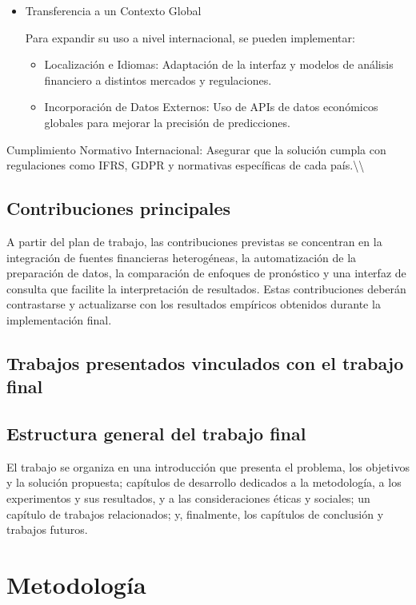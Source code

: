 \documentclass[12pt,letterpaper,oneside]{report}
\renewcommand{\_}{\UnderscoreOriginal\allowbreak}
\begin{document}
\begin{itemize}
\item Transferencia a un Contexto Global \parencite{CastroAguilar2017}

Para expandir su uso a nivel internacional, se pueden implementar:
\begin{itemize}
\item Localización e Idiomas: Adaptación de la interfaz y modelos de análisis financiero a distintos mercados y regulaciones.
\item Incorporación de Datos Externos: Uso de APIs de datos económicos globales para mejorar la precisión de predicciones.
\end{itemize}

\end{itemize}
Cumplimiento Normativo Internacional: Asegurar que la solución cumpla con regulaciones como IFRS, GDPR y normativas específicas de cada país.\textbackslash{}\textbackslash{}

\section{Contribuciones principales}
A partir del plan de trabajo, las contribuciones previstas se concentran en la integración de fuentes financieras heterogéneas, la automatización de la preparación de datos, la comparación de enfoques de pronóstico y una interfaz de consulta que facilite la interpretación de resultados. Estas contribuciones deberán contrastarse y actualizarse con los resultados empíricos obtenidos durante la implementación final.

\section{Trabajos presentados vinculados con el trabajo final}

\section{Estructura general del trabajo final}
El trabajo se organiza en una introducción que presenta el problema, los objetivos y la solución propuesta; capítulos de desarrollo dedicados a la metodología, a los experimentos y sus resultados, y a las consideraciones éticas y sociales; un capítulo de trabajos relacionados; y, finalmente, los capítulos de conclusión y trabajos futuros.

\chapter{Metodología}
\label{cap:metodologia}
\end{document}
